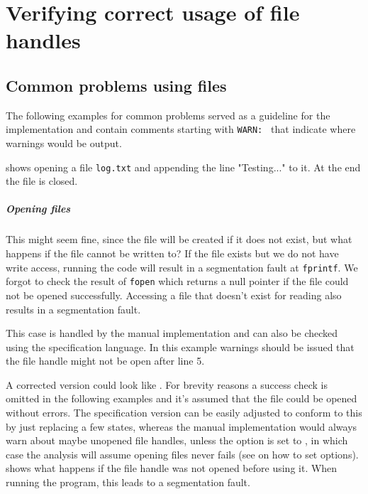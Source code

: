 \chapter{Verifying correct usage of file handles}
\label{chap:file}
\section{Common problems using files}
The following examples for common problems served as a guideline for the implementation and contain comments starting with \verb|WARN: | that indicate where warnings would be output.

 shows opening a file \verb|log.txt| and appending the line "Testing..." to it. At the end the file is closed.

\paragraph*{Opening files}
This might seem fine, since the file will be created if it does not exist, but what happens if the file cannot be written to?
If the file exists but we do not have write access, running the code will result in a segmentation fault at \verb|fprintf|.
We forgot to check the result of \verb|fopen| which returns a null pointer if the file could not be opened successfully.
Accessing a file that doesn't exist for reading also results in a segmentation fault.

This case is handled by the manual implementation and can also be checked using the specification language. In this example warnings should be issued that the file handle might not be open after line 5.

A corrected version could look like .
For brevity reasons a success check is omitted in the following examples and it's assumed that the file could be opened without errors. The specification version can be easily adjusted to conform to this by just replacing a few states, whereas the manual implementation would always warn about maybe unopened file handles, unless the option  is set to , in which case the analysis will assume opening files never fails (see  on how to set options).
 shows what happens if the file handle was not opened before using it. When running the program, this leads to a segmentation fault.

